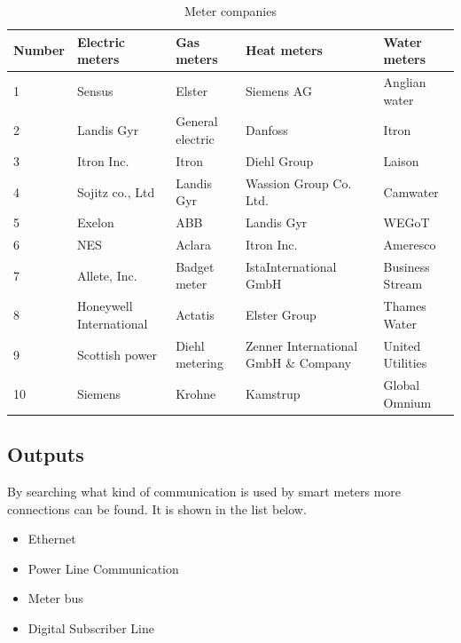 \begin{table}[H]
    \hspace{-2.0cm}
    \begin{tabular}{|p{1.5cm}|p{3.8cm}|p{2.7cm}|p{6cm}|p{2.9cm}|}\hline
        \textbf{Number} & \textbf{Electric meters}\cite{TOP10ELECMET} & \textbf{Gas meters}\cite{TOP10GASMET} & \textbf{Heat meters}\cite{TOP10HEATMET}& \textbf{Water meters}\cite{TOP10WATERMET}\\\hline
        1 & Sensus & Elster & Siemens AG & Anglian water\\\hline
        2 & Landis \+ Gyr & General electric & Danfoss& Itron\\\hline
        3 & Itron Inc. & Itron & Diehl Group& Laison\\\hline
        4 & Sojitz co., Ltd & Landis \+ Gyr & Wassion Group Co. Ltd.&Camwater \\\hline
        5 & Exelon & ABB &  Landis \+ Gyr&WEGoT\\\hline
        6 & NES & Aclara & Itron Inc.&Ameresco\\\hline
        7 & Allete, Inc. & Badget meter & IstaInternational GmbH&Business Stream\\\hline
        8 & Honeywell International& Actatis & Elster Group&Thames Water\\\hline
        9 & Scottish power& Diehl metering& Zenner International GmbH \& Company&United Utilities\\\hline
        10 & Siemens & Krohne & Kamstrup&Global Omnium\\\hline
    \end{tabular}
    \caption{Meter companies}
    \label{tab:Meter_companies}
\end{table}

\subsection{Outputs}
By searching what kind of communication is used by smart meters more connections can be found. It is shown in the list below.

\begin{itemize}
    \item Ethernet\cite{ConnectionsSmartMeter}\cite{ConnectionsSmartMeter2}
    \item Power Line Communication\cite{ConnectionsSmartMeter}\cite{ConnectionsSmartMeter2}
    \item Meter bus\cite{ConnectionsSmartMeter}
    \item Digital Subscriber Line \cite{ConnectionsSmartMeter2}
\end{itemize}